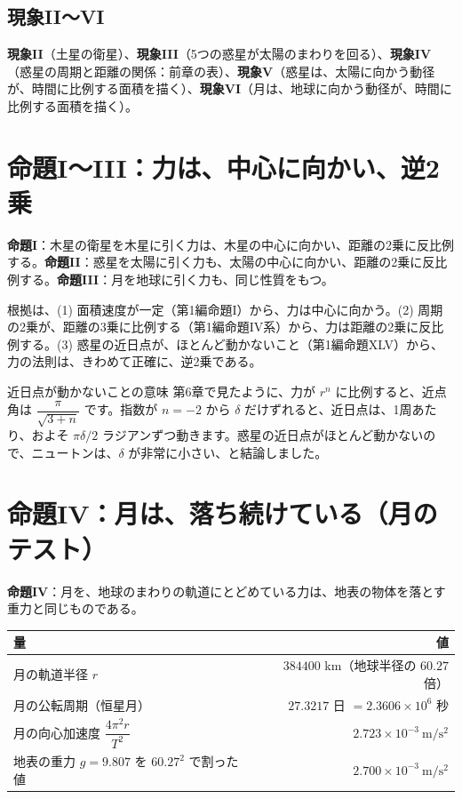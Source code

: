 \documentclass[a4paper,11pt,openany]{ltjsbook}
\begin{document}
\subsection{現象II〜VI}

\textbf{現象II}（土星の衛星）、\textbf{現象III}（5つの惑星が太陽のまわりを回る）、\textbf{現象IV}（惑星の周期と距離の関係：前章の表）、\textbf{現象V}（惑星は、太陽に向かう動径が、時間に比例する面積を描く）、\textbf{現象VI}（月は、地球に向かう動径が、時間に比例する面積を描く）。

\section{命題I〜III：力は、中心に向かい、逆2乗}

\textbf{命題I}：木星の衛星を木星に引く力は、木星の中心に向かい、距離の2乗に反比例する。\textbf{命題II}：惑星を太陽に引く力も、太陽の中心に向かい、距離の2乗に反比例する。\textbf{命題III}：月を地球に引く力も、同じ性質をもつ。

根拠は、(1) 面積速度が一定（第1編命題I）から、力は中心に向かう。(2) 周期の2乗が、距離の3乗に比例する（第1編命題IV系）から、力は距離の2乗に反比例する。(3) 惑星の近日点が、ほとんど動かないこと（第1編命題XLV）から、力の法則は、きわめて正確に、逆2乗である。

\begin{examplebox}{近日点が動かないことの意味}
第6章で見たように、力が $r^n$ に比例すると、近点角は $\dfrac{\pi}{\sqrt{3+n}}$ です。指数が $n=-2$ から $\delta$ だけずれると、近日点は、1周あたり、およそ $\pi\delta/2$ ラジアンずつ動きます。惑星の近日点がほとんど動かないので、ニュートンは、$\delta$ が非常に小さい、と結論しました。
\end{examplebox}

\section{命題IV：月は、落ち続けている（月のテスト）}

\textbf{命題IV}：月を、地球のまわりの軌道にとどめている力は、地表の物体を落とす重力と同じものである。

\begin{center}
\renewcommand{\arraystretch}{1.3}
\begin{tabular}{lr}
\toprule
量 & 値\\
\midrule
月の軌道半径 $r$ & $384400$ km（地球半径の $60.27$ 倍）\\
月の公転周期（恒星月） & $27.3217$ 日 $=2.3606\times10^6$ 秒\\
月の向心加速度 $\dfrac{4\pi^2r}{T^2}$ & $2.723\times10^{-3}\ \mathrm{m/s^2}$\\
地表の重力 $g=9.807$ を $60.27^2$ で割った値 & $2.700\times10^{-3}\ \mathrm{m/s^2}$\\
\bottomrule
\end{tabular}
\end{center}
\end{document}
